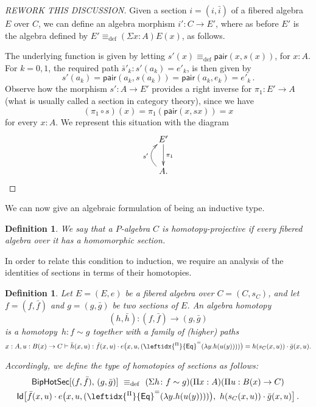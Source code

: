 \documentclass[reqno,10pt,a4paper,oneside]{amsart}
\numberwithin{equation}{section}
\theoremstyle{mythm}
\theoremstyle{mydef}
\newtheorem{definition}[theorem]{Definition}
\theoremstyle{myrmk}
\newcommand{\ie}{\text{i.e.\ }}
\newcommand{\deq}{\equiv}
\newcommand{\defeq}{\deq_{\mathrm{def}}}
\newcommand{\co}{\colon}
\newcommand{\ct}{\cdot}
\newcommand{\funext}{\leftidx{^\Pi}{\mathsf{Eq}}^{=}}
\newcommand{\pair}{\mathsf{pair}}
\newcommand{\Id}{\mathsf{Id}}
\newcommand{\HoSec}{\mathsf{BipHotSec}}
\begin{document}
\begin{proof}
[REWORK THIS DISCUSSION]
Given a section $i = (i, \bar{i})$ of a fibered algebra $E$ over $C$, we can define an algebra morphism $i' \co C \to E'$, where as before $E'$ is the algebra defined by $E' \defeq (\Sigma x :A) E(x)$, as follows.

The underlying function is given by letting $s'(x) \defeq \pair(x, s(x))$, for $x : A$. For $k = 0, 1$, the required path $\bar{s}'_k \co s'(a_k) = e'_k$,
is then given by
\[
s'(a_k) = \pair(a_k, s(a_k)) =  \pair(a_k, e_k) = e'_k \, .
\]
Observe how the morphism $s' \co A \to E'$ provides a right inverse for $\pi_1 \co E' \to A$ (\ie what is usually called a section in 
category theory), since we have
\[
(\pi_1 \circ s)(x) = \pi_1 (\pair(x, sx)) = x 
\]
for every $x \co A$. We represent this situation with the diagram
\[
\xymatrix{
E' \ar[d]^{\pi_1} \\
A . \ar@/^1.2pc/[u]^{s'} }
\]
\end{proof}

We can now give an algebraic formulation of being an inductive type.

\begin{definition} We say that a $P$-algebra $C$ is \emph{homotopy-projective} if every fibered algebra over it has a homomorphic section.
\end{definition} 

In order to relate this condition to induction, we require an analysis of the identities of sections in terms of their homotopies.

\begin{definition} \label{def:W2cellsection} Let $E = (E, e)$ be a fibered algebra over $C = (C, s_C)$, and let $f = (f, \bar{f})$ and $g = (g, \bar{g})$ be two sections of $E$.  An \emph{algebra homotopy} 
\[
(h, \bar{h}) \co (f, \bar{f})  \rightarrow (g, \bar{g})
\] 
is a homotopy~$h\co f \sim g$ together with a family of (higher) paths 
\[
x : A, u : B(x) \to C \vdash \bar{h}(x,u) : 
\bar{f}(x,u)  \ct e\big(x,u,(\funext(\lambda{y}.h(u(y))))\big) = 
h(s_C(x,u)) \ct \bar{g}(x,u).
\]

Accordingly, we define the type of homotopies of sections as follows:
\begin{multline*}
\HoSec[ (f, \bar{f}) ,\, (g, \bar{g}) ]\ \defeq\ 
(\Sigma h \co f \sim g) (\Pi x : A)(\Pi u : B(x) \to C)\\
\Id\big[ \bar{f}(x,u)  \ct e\big(x,u,(\funext(\lambda{y}.h(u(y))))\big),\ 
h(s_C(x,u)) \ct \bar{g}(x,u) \big]\, .
\end{multline*}
\end{definition} 
\end{document}
